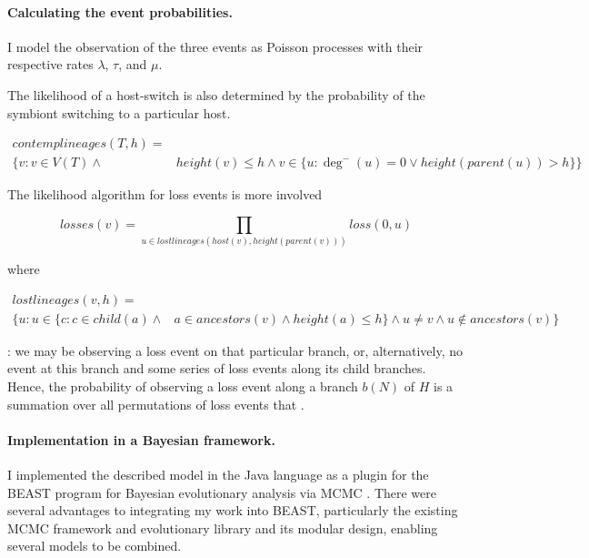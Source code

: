 \documentclass[12pt,letterpaper]{article}
\begin{document}
\paragraph*{Calculating the event probabilities.} 

I model the observation of the three events as Poisson processes with their respective rates $\lambda$, $\tau$, and $\mu$.

The likelihood of a host-switch is also determined by the probability of the symbiont switching to a particular host.

\begin{equation}
\begin{split}
contemplineages(T,h) = \\ \{v : v \in V(T) \wedge & height(v) \leq h \wedge v \in \{u : \deg^-(u) = 0 \vee height(parent(u)) > h\} \}
\end{split}
\end{equation}

The likelihood algorithm for loss events is more involved

\begin{equation}
losses(v) = \prod_{u \in lostlineages(host(v),height(parent(v)))} loss(0,u)
\end{equation}

where 

\begin{equation}
\begin{split}
lostlineages(v,h) = \\ \{u : u \in \{ c : c \in child(a) \wedge & a \in ancestors(v) \wedge height(a) \leq h \} \wedge u \neq v \wedge u \not\in ancestors(v) \}
\end{split}
\end{equation}

: we may be observing a loss event on that particular branch, or, alternatively, no event at this branch and some series of loss events along its child branches. Hence, the probability of observing a loss event along a branch $b(N)$ of $H$ is a summation over all permutations of loss events that . 

\paragraph*{Implementation in a Bayesian framework.}

I implemented the described model in the Java language as a plugin for the BEAST program for Bayesian evolutionary analysis via \ac{MCMC} \parencite{Drummond:2012}. There were several advantages to integrating my work into BEAST, particularly the existing \ac{MCMC} framework and evolutionary library and its modular design, enabling several models to be combined.
\end{document}
